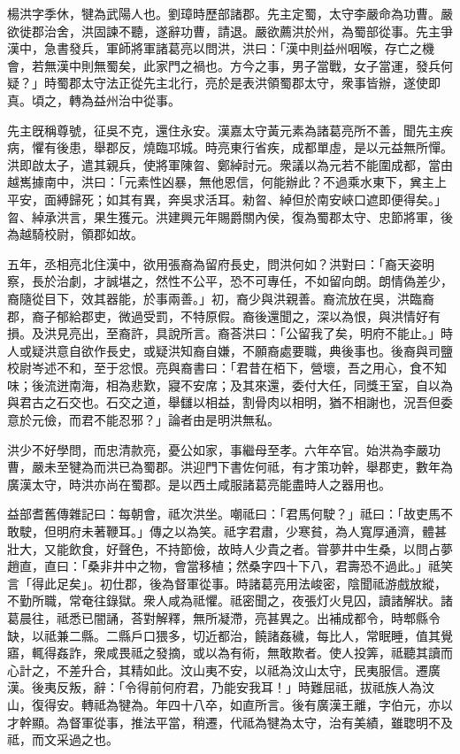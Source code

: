 
\begin{pinyinscope}
楊洪字季休，犍為武陽人也。劉璋時歷部諸郡。先主定蜀，太守李嚴命為功曹。嚴欲徙郡治舍，洪固諫不聽，遂辭功曹，請退。嚴欲薦洪於州，為蜀部從事。先主爭漢中，急書發兵，軍師將軍諸葛亮以問洪，洪曰：「漢中則益州咽喉，存亡之機會，若無漢中則無蜀矣，此家門之禍也。方今之事，男子當戰，女子當運，發兵何疑？」時蜀郡太守法正從先主北行，亮於是表洪領蜀郡太守，衆事皆辦，遂使即真。頃之，轉為益州治中從事。

先主旣稱尊號，征吳不克，還住永安。漢嘉太守黃元素為諸葛亮所不善，聞先主疾病，懼有後患，舉郡反，燒臨邛城。時亮東行省疾，成都單虛，是以元益無所憚。洪即啟太子，遣其親兵，使將軍陳曶、鄭綽討元。衆議以為元若不能圍成都，當由越嶲據南中，洪曰：「元素性凶暴，無他恩信，何能辦此？不過乘水東下，兾主上平安，面縛歸死；如其有異，奔吳求活耳。勑曶、綽但於南安峽口遮即便得矣。」曶、綽承洪言，果生獲元。洪建興元年賜爵關內侯，復為蜀郡太守、忠節將軍，後為越騎校尉，領郡如故。

五年，丞相亮北住漢中，欲用張裔為留府長史，問洪何如？洪對曰：「裔天姿明察，長於治劇，才誠堪之，然性不公平，恐不可專任，不如留向朗。朗情偽差少，裔隨從目下，效其器能，於事兩善。」初，裔少與洪親善。裔流放在吳，洪臨裔郡，裔子郁給郡吏，微過受罰，不特原假。裔後還聞之，深以為恨，與洪情好有損。及洪見亮出，至裔許，具說所言。裔荅洪曰：「公留我了矣，明府不能止。」時人或疑洪意自欲作長史，或疑洪知裔自嫌，不願裔處要職，典後事也。後裔與司鹽校尉岑述不和，至于忿恨。亮與裔書曰：「君昔在栢下，營壞，吾之用心，食不知味；後流迸南海，相為悲歎，寢不安席；及其來還，委付大任，同獎王室，自以為與君古之石交也。石交之道，舉讎以相益，割骨肉以相明，猶不相謝也，況吾但委意於元儉，而君不能忍邪？」論者由是明洪無私。

洪少不好學問，而忠清款亮，憂公如家，事繼母至孝。六年卒官。始洪為李嚴功曹，嚴未至犍為而洪已為蜀郡。洪迎門下書佐何祗，有才策功幹，舉郡吏，數年為廣漢太守，時洪亦尚在蜀郡。是以西土咸服諸葛亮能盡時人之器用也。

益部耆舊傳雜記曰：每朝會，祗次洪坐。嘲祗曰：「君馬何駛？」祗曰：「故吏馬不敢駛，但明府未著鞭耳。」傳之以為笑。祗字君肅，少寒貧，為人寬厚通濟，體甚壯大，又能飲食，好聲色，不持節儉，故時人少貴之者。甞夢井中生桑，以問占夢趙直，直曰：「桑非井中之物，會當移植；然桑字四十下八，君壽恐不過此。」祗笑言「得此足矣」。初仕郡，後為督軍從事。時諸葛亮用法峻密，陰聞祗游戲放縱，不勤所職，常奄往錄獄。衆人咸為祗懼。祗密聞之，夜張灯火見囚，讀諸解狀。諸葛晨往，祗悉已闇誦，荅對解釋，無所凝滯，亮甚異之。出補成都令，時郫縣令缺，以祗兼二縣。二縣戶口猥多，切近都治，饒諸姦穢，每比人，常眠睡，值其覺寤，輒得姦詐，衆咸畏祗之發摘，或以為有術，無敢欺者。使人投筭，祗聽其讀而心計之，不差升合，其精如此。汶山夷不安，以祗為汶山太守，民夷服信。遷廣漢。後夷反叛，辭：「令得前何府君，乃能安我耳！」時難屈祗，拔祗族人為汶山，復得安。轉祗為犍為。年四十八卒，如直所言。後有廣漢王離，字伯元，亦以才幹顯。為督軍從事，推法平當，稍遷，代祗為犍為太守，治有美績，雖聦明不及祗，而文采過之也。


\end{pinyinscope}